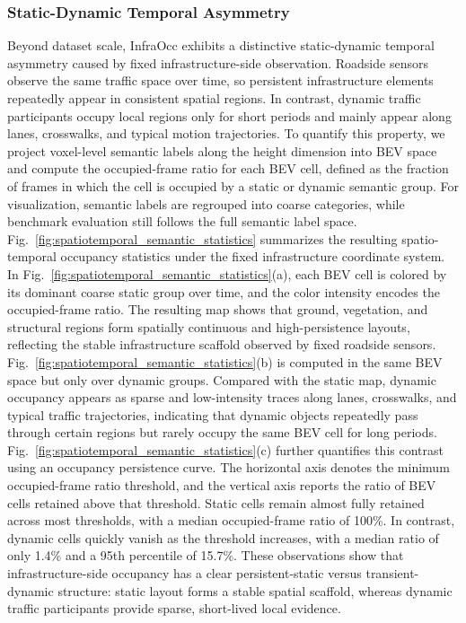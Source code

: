 



\subsubsection{Static-Dynamic Temporal Asymmetry}
Beyond dataset scale, InfraOcc exhibits a distinctive static-dynamic temporal
asymmetry caused by fixed infrastructure-side observation. Roadside sensors
observe the same traffic space over time, so persistent infrastructure elements
repeatedly appear in consistent spatial regions. In contrast, dynamic traffic
participants occupy local regions only for short periods and mainly appear
along lanes, crosswalks, and typical motion trajectories.
To quantify this property, we project voxel-level semantic labels along the
height dimension into BEV space and compute the occupied-frame ratio for each
BEV cell, defined as the fraction of frames in which the cell is occupied by a
static or dynamic semantic group. For visualization, semantic labels are
regrouped into coarse categories, while benchmark evaluation still follows the
full semantic label space.
Fig.~\ref{fig:spatiotemporal_semantic_statistics} summarizes the resulting
spatio-temporal occupancy statistics under the fixed infrastructure coordinate
system. In Fig.~\ref{fig:spatiotemporal_semantic_statistics}(a), each BEV cell
is colored by its dominant coarse static group over time, and the color
intensity encodes the occupied-frame ratio. The resulting map shows that
ground, vegetation, and structural regions form spatially continuous and
high-persistence layouts, reflecting the stable infrastructure scaffold
observed by fixed roadside sensors. Fig.~\ref{fig:spatiotemporal_semantic_statistics}(b)
is computed in the same BEV space but only over dynamic groups. Compared with
the static map, dynamic occupancy appears as sparse and low-intensity traces
along lanes, crosswalks, and typical traffic trajectories, indicating that
dynamic objects repeatedly pass through certain regions but rarely occupy the
same BEV cell for long periods. 
Fig.~\ref{fig:spatiotemporal_semantic_statistics}(c) further quantifies this
contrast using an occupancy persistence curve. The horizontal axis denotes the
minimum occupied-frame ratio threshold, and the vertical axis reports the ratio
of BEV cells retained above that threshold. Static cells remain almost fully
retained across most thresholds, with a median occupied-frame ratio of 100\%.
In contrast, dynamic cells quickly vanish as the threshold increases, with a
median ratio of only 1.4\% and a 95th percentile of 15.7\%. These observations
show that infrastructure-side occupancy has a clear persistent-static versus
transient-dynamic structure: static layout forms a stable spatial scaffold,
whereas dynamic traffic participants provide sparse, short-lived local evidence.

